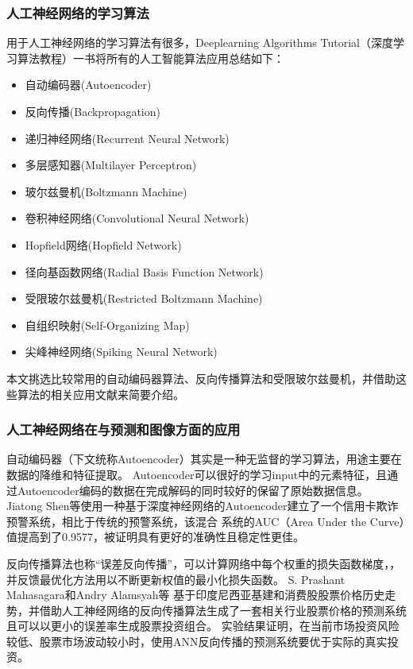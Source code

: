 \documentclass[12pt,a4paper,UTF8]{ctexart}
\begin{document}
\subsubsection{人工神经网络的学习算法}
用于人工神经网络的学习算法有很多，Deeplearning Algorithms Tutorial（深度学习算法教程）一书将所有的人工智能算法应用总结如下\cite{DeeplearningAlgorithmsTutorial}：
\begin{itemize}
    \item 自动编码器(Autoencoder)
    \item 反向传播(Backpropagation)
    \item 递归神经网络(Recurrent Neural Network)
    \item 多层感知器(Multilayer Perceptron)
    \item 玻尔兹曼机(Boltzmann Machine)
    \item 卷积神经网络(Convolutional Neural Network)
    \item Hopfield网络(Hopfield Network)
    \item 径向基函数网络(Radial Basis Function Network)
    \item 受限玻尔兹曼机(Restricted Boltzmann Machine)
    \item 自组织映射(Self-Organizing Map)
    \item 尖峰神经网络(Spiking Neural Network)
\end{itemize}    
本文挑选比较常用的自动编码器算法、反向传播算法和受限玻尔兹曼机，并借助这些算法的相关应用文献来简要介绍。
\subsubsection{人工神经网络在与预测和图像方面的应用}
自动编码器（下文统称Autoencoder）其实是一种无监督的学习算法，用途主要在数据的降维和特征提取。
Autoencoder可以很好的学习input中的元素特征，且通过Autoencoder编码的数据在完成解码的同时较好的保留了原始数据信息。
Jiatong Shen等\cite{shenCreditCardFraud2021}使用一种基于深度神经网络的Autoencoder建立了一个信用卡欺诈预警系统，相比于传统的预警系统，该混合
系统的AUC（Area Under the Curve）值提高到了0.9577，被证明具有更好的准确性且稳定性更佳。

反向传播算法也称“误差反向传播”，可以计算网络中每个权重的损失函数梯度，，并反馈最优化方法用以不断更新权值的最小化损失函数。
S. Prashant Mahasagara和Andry Alamsyah等\cite{mahasagaraIndonesiaInfrastructureConsumer2017}
基于印度尼西亚基建和消费股股票价格历史走势，并借助人工神经网络的反向传播算法生成了一套相关行业股票价格的预测系统且可以以更小的误差率生成股票投资组合。
实验结果证明，在当前市场投资风险较低、股票市场波动较小时，使用ANN反向传播的预测系统要优于实际的真实投资。
\end{document}
